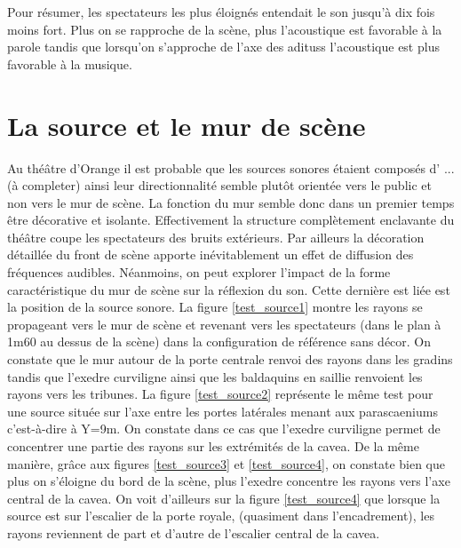 Pour résumer, les spectateurs les plus éloignés entendait le son jusqu'à dix fois moins fort. Plus on se rapproche de la scène, plus l'acoustique est favorable à la parole tandis que lorsqu'on s'approche de l'axe des \glspl{aditus} l'acoustique est plus favorable à la musique.

\section{La source et le mur de scène}

Au théâtre d'Orange il est probable que les sources sonores étaient composés d' ... (à completer)
ainsi leur directionnalité semble plutôt orientée vers le public et non vers le mur de scène. La fonction du mur semble donc dans un premier temps être décorative et isolante. Effectivement la structure complètement enclavante du théâtre coupe les spectateurs des bruits extérieurs. Par ailleurs la décoration détaillée du front de scène apporte inévitablement un effet de diffusion des  fréquences audibles. Néanmoins, on peut explorer l'impact de la forme caractéristique du mur de scène sur la réflexion du son. Cette dernière est liée est la position de la source sonore. La figure \ref{test_source1} montre les rayons se propageant vers le mur de scène et revenant vers les spectateurs (dans le plan à 1m60 au dessus de la scène) dans la configuration de référence sans décor. On constate que le mur autour de la porte centrale renvoi des rayons dans les gradins tandis que l'\gls{exedre} curviligne ainsi que les baldaquins en saillie renvoient les rayons vers les tribunes. La figure \ref{test_source2} représente le même test pour une source située sur l'axe entre les portes latérales menant aux \glspl{parascaenium} c'est-à-dire à Y=9m. On constate dans ce cas que l'\gls{exedre} curviligne permet de concentrer une partie des rayons sur les extrémités de la \gls{cavea}. De la même manière, grâce aux figures \ref{test_source3} et \ref{test_source4}, on constate bien que plus on s'éloigne du bord de la scène, plus l'\gls{exedre} concentre les rayons vers l'axe central de la \gls{cavea}. On voit d'ailleurs sur la figure \ref{test_source4} que lorsque la source est sur l'escalier de la porte royale, (quasiment dans l'encadrement), les rayons reviennent de part et d'autre de l'escalier central de la \gls{cavea}. 

